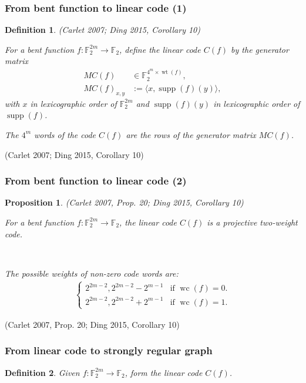 \documentclass[pdf,sprung,slideColor,nocolorBG]{beamer}
\newenvironment{colortheme}[1]{
\def\ProvidesPackageRCS $##1${\relax}
\renewcommand{\ProcessOptions}{\relax}
\makeatletter

\makeatother
}{}
\newcommand{\slidecite}[1]{\tiny{(#1)}\normalsize{}}
\newcommand{\smallcite}[1]{\small{(#1)}\normalsize{}}
\newcommand{\mb}[1]{\mathbb{#1}}
\newcommand{\To}{\rightarrow}
\newcommand{\support}[1]{\operatorname{supp}\left(#1\right)}
\newcommand{\weight}[1]{\operatorname{wt}\left(#1\right)}
\newcommand{\weightclass}[1]{\operatorname{wc}\left(#1\right)}
\newcommand{\F}{\mb{F}}
\newtheorem{Def}{Definition}
\newtheorem{Proposition}{Proposition}
\begin{document}
\begin{colortheme}{seagull}
\begin{frame}
\frametitle{From bent function to linear code (1)}
\begin{Def}

\smallcite{Carlet 2007; Ding 2015, Corollary 10}

For a bent function $f : \F_2^{2m} \To \F_2$,
define the linear code $C(f)$ by the generator matrix
\begin{align*}
M C(f) &\in \F_2^{4^m \times \weight{f}},
\\
M C(f)_{x,y} &:= \langle x, \support{f}(y) \rangle,
\end{align*}
with $x$ in lexicographic order of $\F_2^{2m}$
and $\support{f}(y)$ in lexicographic order of $\support{f}$.

The $4^m$ words of the code $C(f)$ are the rows of the generator matrix $M C(f)$.
\end{Def}

\slidecite{Carlet 2007; Ding 2015, Corollary 10}

\end{frame}
\begin{frame}
\frametitle{From bent function to linear code (2)}
\begin{Proposition}
\smallcite{Carlet 2007, Prop. 20; Ding 2015, Corollary 10}

For a bent function $f : \F_2^{2m} \To \F_2$, the linear code $C(f)$
is a projective two-weight code.

~

The possible weights of non-zero code words are:
\begin{align*}
\begin{cases}
2^{2m-2}, 2^{2m-2} - 2^{m-1} & \text{if~} \weightclass{f}=0.
\\
2^{2m-2}, 2^{2m-2} + 2^{m-1} & \text{if~} \weightclass{f}=1.
\end{cases}
\end{align*}

\end{Proposition}

\slidecite{Carlet 2007, Prop. 20; Ding 2015, Corollary 10}

\end{frame}
\begin{frame}
\frametitle{From linear code to strongly regular graph}
\begin{Def}
\label{R-f-def}
Given $f : \F_2^{2m} \To \F_2$, form the linear code $C(f)$.


\end{Def}
\end{frame}
\end{colortheme}
\end{document}
